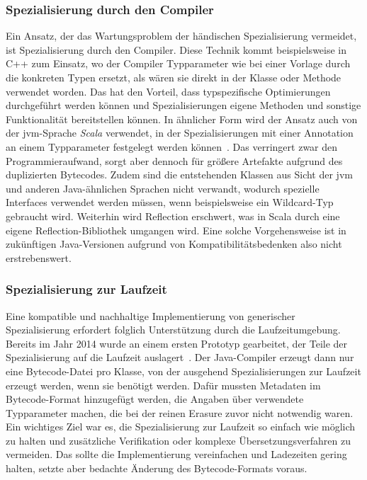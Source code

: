 \subsubsection{Spezialisierung durch den Compiler}

Ein Ansatz, der das Wartungsproblem der händischen Spezialisierung vermeidet, ist Spezialisierung durch den Compiler.
Diese Technik kommt beispielsweise in C++ zum Einsatz, wo der Compiler Typparameter wie bei einer Vorlage durch die konkreten Typen ersetzt, als wären sie direkt in der Klasse oder Methode verwendet worden.
Das hat den Vorteil, dass typspezifische Optimierungen durchgeführt werden können und Spezialisierungen eigene Methoden und sonstige Funktionalität bereitstellen können.
In ähnlicher Form wird der Ansatz auch von der \ac{jvm}-Sprache \emph{Scala} verwendet, in der Spezialisierungen mit einer Annotation an einem Typparameter festgelegt werden können~\cite{scala-specialized}.
Das verringert zwar den Programmieraufwand, sorgt aber dennoch für größere Artefakte aufgrund des duplizierten Bytecodes.
Zudem sind die entstehenden Klassen aus Sicht der \ac{jvm} und anderen Java-ähnlichen Sprachen nicht verwandt, wodurch spezielle Interfaces verwendet werden müssen, wenn beispielsweise ein Wildcard-Typ gebraucht wird.
Weiterhin wird Reflection erschwert, was in Scala durch eine eigene Reflection-Bibliothek umgangen wird.
Eine solche Vorgehensweise ist in zukünftigen Java-Versionen aufgrund von Kompatibilitätsbedenken also nicht erstrebenswert.

\subsubsection{Spezialisierung zur Laufzeit}

Eine kompatible und nachhaltige Implementierung von generischer Spezialisierung erfordert folglich Unterstützung durch die Laufzeitumgebung.
Bereits im Jahr 2014 wurde an einem ersten Prototyp gearbeitet, der Teile der Spezialisierung auf die Laufzeit auslagert~\cite{specialization}.
Der Java-Compiler erzeugt dann nur eine Bytecode-Datei pro Klasse, von der ausgehend Spezialisierungen zur Laufzeit erzeugt werden, wenn sie benötigt werden.
Dafür mussten Metadaten im Bytecode-Format hinzugefügt werden, die Angaben über verwendete Typparameter machen, die bei der reinen Erasure zuvor nicht notwendig waren.
Ein wichtiges Ziel war es, die Spezialisierung zur Laufzeit so einfach wie möglich zu halten und zusätzliche Verifikation oder komplexe Übersetzungsverfahren zu vermeiden.
Das sollte die Implementierung vereinfachen und Ladezeiten gering halten, setzte aber bedachte Änderung des Bytecode-Formats voraus.

